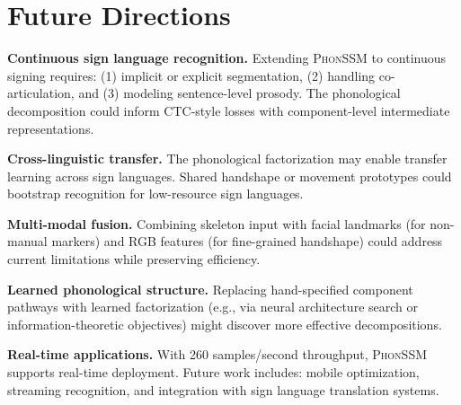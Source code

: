 \documentclass{article}
\newcommand{\phonssm}{\textsc{PhonSSM}}
\begin{document}
\section{Future Directions}
\label{app:future}

\textbf{Continuous sign language recognition.} Extending \phonssm{} to continuous signing requires: (1) implicit or explicit segmentation, (2) handling co-articulation, and (3) modeling sentence-level prosody. The phonological decomposition could inform CTC-style losses with component-level intermediate representations.

\textbf{Cross-linguistic transfer.} The phonological factorization may enable transfer learning across sign languages. Shared handshape or movement prototypes could bootstrap recognition for low-resource sign languages.

\textbf{Multi-modal fusion.} Combining skeleton input with facial landmarks (for non-manual markers) and RGB features (for fine-grained handshape) could address current limitations while preserving efficiency.

\textbf{Learned phonological structure.} Replacing hand-specified component pathways with learned factorization (e.g., via neural architecture search or information-theoretic objectives) might discover more effective decompositions.

\textbf{Real-time applications.} With 260 samples/second throughput, \phonssm{} supports real-time deployment. Future work includes: mobile optimization, streaming recognition, and integration with sign language translation systems.
\end{document}
